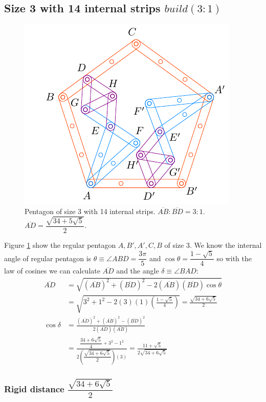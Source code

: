\documentclass[11pt]{article}
\begin{document}
\subsection{Size 3 with 14 internal strips $build(3:1)$}

\begin{figure}[H]
\centering
\includegraphics[scale=1.2]{3/penta3-14a}
\caption{Pentagon of size 3 with 14 internal strips. $\overline{AB}:\overline{BD} = 3:1$. $\overline{AD} = \dfrac{\sqrt{34+5\sqrt5}}2$.}
\label{fig:penta3-14a}
\end{figure}

Figure \ref{fig:penta3-14a} show the regular pentagon $A,B',A',C,B$ of size $3$. We know the internal angle of regular pentagon is $\theta \equiv \angle{ABD} = \dfrac{3\pi}5$ and $\cos\theta=\dfrac{1-\sqrt5}4$ so with the law of cosines we can calculate $\overline{AD}$ and the angle $\delta \equiv \angle{BAD}$:
\begin{align}
\overline{AD} &= \sqrt{(\overline{AB})^2 + (\overline{BD})^2
 - 2(\overline{AB})(\overline{BD})\cos\theta} \nonumber\\
 &= \sqrt{3^2 + 1^2 - 2(3)(1)\left(\frac{1-\sqrt5}4\right)} = \frac{\sqrt{34+6\sqrt5}}2\\
\cos\delta &= \frac{(\overline{AD})^2 + (\overline{AB})^2 - (\overline{BD})^2}
 {2(\overline{AD})(\overline{AB})} \nonumber\\
 &= \frac{\dfrac{34+6\sqrt5}4 + 3^2 - 1^2}{2\left(\dfrac{\sqrt{34+6\sqrt5}}2\right)(3)}
  = \frac{11+\sqrt5}{2\sqrt{34+6\sqrt5}}
\end{align}

\subsubsection{Rigid distance  $\dfrac{\sqrt{34+6\sqrt5}}2$}
\end{document}
